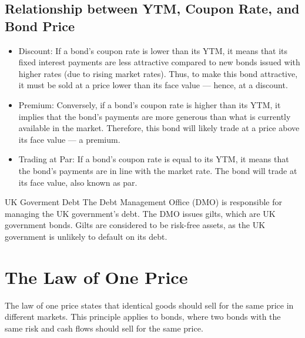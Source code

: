 \subsection*{Relationship between YTM, Coupon Rate, and Bond Price}
\begin{itemize}
    \item Discount: If a bond's coupon rate is lower than its YTM, it means that its fixed interest payments are less attractive compared to new bonds issued with higher rates (due to rising market rates). Thus, to make this bond attractive, it must be sold at a price lower than its face value — hence, at a discount.
    \item Premium: Conversely, if a bond's coupon rate is higher than its YTM, it implies that the bond’s payments are more generous than what is currently available in the market. Therefore, this bond will likely trade at a price above its face value — a premium.
    \item Trading at Par: If a bond's coupon rate is equal to its YTM, it means that the bond's payments are in line with the market rate. The bond will trade at its face value, also known as par.
\end{itemize}
    
\begin{definitionbox}{UK Goverment Debt}
    The Debt Management Office (DMO) is responsible for managing the UK government's debt. The DMO issues gilts, which are UK government bonds. Gilts are considered to be risk-free assets, as the UK government is unlikely to default on its debt.
\end{definitionbox}

\section{The Law of One Price}
The law of one price states that identical goods should sell for the same price in different markets. This principle applies to bonds, where two bonds with the same risk and cash flows should sell for the same price.


